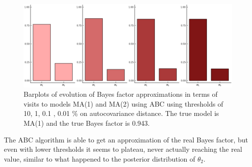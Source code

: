 \documentclass[runningheads]{llncs}
\begin{document}
    \begin{figure}[H]
        \centering
        \includegraphics[width=12cm]{images/ModelChoice_MA1.png}
        \caption{Barplots of evolution of Bayes factor approximations
        in terms of visits to models MA(1) and MA(2) using
        ABC using thresholds of 10, 1, 0.1 , 0.01 \% on autocovariance
        distance. The true model is MA(1) and the true Bayes factor is 0.943.
        }
    \end{figure}

The ABC algorithm is able to get an approximation of the real
Bayes factor, but even with lower thresholds it seems to plateau,
never actually reaching the real value, similar to what happened
to the posterior distribution of $\theta_2$.


%
%
%


%
\end{document}
